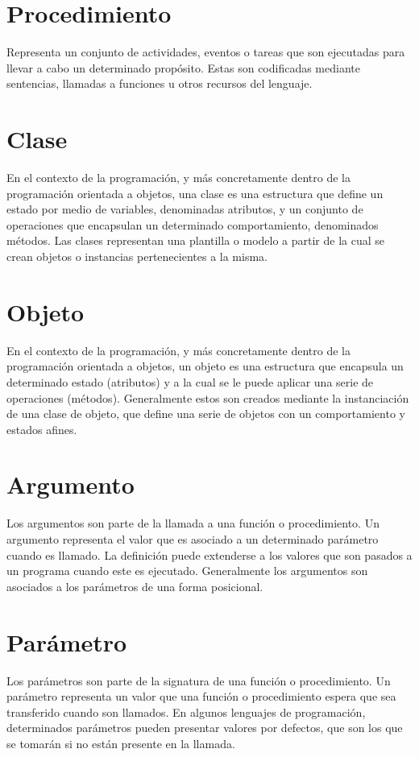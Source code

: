 \section{Procedimiento}
Representa un conjunto de actividades, eventos o tareas que son ejecutadas para llevar a cabo un determinado propósito. Estas son codificadas mediante sentencias, llamadas a funciones
u otros recursos del lenguaje. 

\section{Clase}
En el contexto de la programación, y más concretamente dentro de la programación orientada a objetos, una clase es una estructura que define un estado por medio de variables, 
denominadas atributos, y un conjunto de operaciones que encapsulan un determinado comportamiento, denominados métodos. Las clases representan una plantilla o modelo a partir de 
la cual se crean objetos o instancias pertenecientes a la misma. 

\section {Objeto}
En el contexto de la programación, y más concretamente dentro de la programación orientada a objetos, un objeto es una estructura que encapsula un determinado estado (atributos) y a la 
cual se le puede aplicar una serie de operaciones (métodos). Generalmente estos son creados mediante la instanciación de una clase de objeto, que define una serie de objetos con un comportamiento y estados afines.

\section {Argumento}
Los argumentos son parte de la llamada a una función o procedimiento. Un argumento representa el valor que es asociado a un determinado parámetro cuando es llamado. La definición puede extenderse a los valores que son pasados
a un programa cuando este es ejecutado. Generalmente los argumentos son asociados a los parámetros de una forma posicional.

\section {Parámetro}
Los parámetros son parte de la signatura de una función o procedimiento. Un parámetro representa un valor que una función o procedimiento espera que sea transferido cuando son llamados. En 
algunos lenguajes de programación, determinados parámetros pueden presentar valores por defectos, que son los que se tomarán si no están presente en la llamada.

